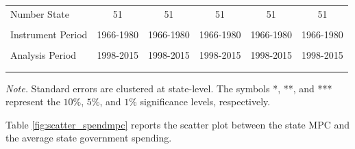 \documentclass[dv_diss_main.tex]{subfiles}
\begin{document}
\begin{table}[H]
\begin{center}
\begin{tabular}{lccccc}
    Number State & 51 & 51 & 51 & 51 & 51 \\
    \vspace{-2pt} & \vspace{-2pt} & \vspace{-2pt} & \vspace{-2pt} & \vspace{-2pt} \\
    Instrument Period & 1966-1980 & 1966-1980 & 1966-1980 & 1966-1980 & 1966-1980 \\
    \vspace{-2pt} & \vspace{-2pt} & \vspace{-2pt} & \vspace{-2pt} & \vspace{-2pt} \\
    Analysis Period & 1998-2015 & 1998-2015 & 1998-2015 & 1998-2015 & 1998-2015 \\ 
    \vspace{-2pt} & \vspace{-2pt} & \vspace{-2pt} & \vspace{-2pt} & \vspace{-2pt} \\ \hline

    \vspace{-2pt} & \vspace{-2pt} & \vspace{-2pt} & \vspace{-2pt} \\
    
    
    \end{tabular}
    \label{tab:crowd_privcons}
    \end{center}
        
    \footnotesize{\textit{Note. }Standard errors are clustered at state-level. The symbols *, **, and *** represent the $10\%$, $5\%$, and $1\%$ significance levels, respectively.}

\end{table}


\newpage
Table \ref{fig:scatter_spendmpc} reports the scatter plot between the state MPC and the average state government spending.
\end{document}
